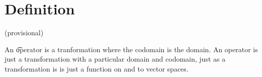

\section*{Definition}

(provisional)

An \t{operator} is a tranformation where the codomain is the domain.
An operator is just a transformation with a particular domain and codomain, just as a transformation is is just a function on and to vector spaces.

\blankpage
